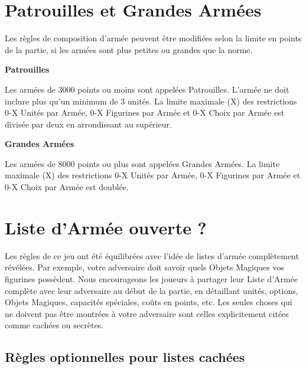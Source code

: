 \section{Patrouilles et Grandes Armées}

Les règles de composition d'armée peuvent être modifiées selon la limite en points de la partie, si les armées sont plus petites ou grandes que la norme.

\begin{multicols}{2}\raggedcolumns

\begin{center}\textbf{Patrouilles}\end{center}

Les armées de 3000 points ou moins sont appelées Patrouilles. L'armée ne doit inclure plus qu'un minimum de 3 unités. La limite maximale (X) des restrictions 0-X Unités par Armée, 0-X Figurines par Armée et 0-X Choix par Armée est divisée par deux en arrondissant au supérieur.

\columnbreak

\begin{center}\textbf{Grandes Armées}\end{center}

Les armées de 8000 points ou plus sont appelées Grandes Armées. La limite maximale (X) des restrictions 0-X Unités par Armée, 0-X Figurines par Armée et 0-X Choix par Armée est doublée.

\end{multicols}

\newpage
\section{Liste d'Armée ouverte ?}

Les règles de ce jeu ont été équilibrées avec l'idée de listes d'armée complètement révélées. Par exemple, votre adversaire doit savoir quels Objets Magiques vos figurines possèdent. Nous encourageons les joueurs à partager leur Liste d'Armée complète avec leur adversaire au début de la partie, en détaillant unités, options, Objets Magiques, capacités spéciales, coûts en points, etc. Les seules choses qui ne doivent pas être montrées à votre adversaire sont celles explicitement citées comme cachées ou secrètes.

\subsection{Règles optionnelles pour listes cachées}
\label{hidden_lists}

